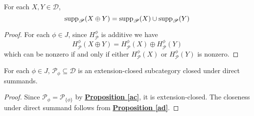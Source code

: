 \begin{prop}\label{ad}
For each $X,Y \in \mathscr{D}$, $$\textnormal{supp}_{\mathscr{P}}(X \oplus Y)= \textnormal{supp}_{\mathscr{P}}(X) \cup \textnormal{supp}_{\mathscr{P}}(Y)$$
\end{prop}

\begin{proof}
For each $\phi \in J$, since $H^{\phi}_{\mathscr{P}}$ is additive we have $$H^{\phi}_{\mathscr{P}}(X \oplus Y)= H^{\phi}_{\mathscr{P}}(X) \oplus H^{\phi}_{\mathscr{P}}(Y)$$
which can be nonzero if and only if either $H^{\phi}_{\mathscr{P}}(X)$ or $H^{\phi}_{\mathscr{P}}(Y)$ is nonzero. 
\end{proof}

\begin{prop}\label{ttc}
For each $\phi \in J$, $\mathscr{P}_{\phi} \subseteq \mathscr{D}$ is an extension-closed subcategory closed under direct summands. 
\end{prop}

\begin{proof}
Since $\mathscr{P}_{\phi}=\mathscr{P}_{\{ \phi \}}$ by \hyperref[ac]{\textbf{Proposition \ref*{ac}}}, it is extension-closed. The closeness under direct summand follows from \hyperref[ad]{\textbf{Proposition \ref*{ad}}}.  
\end{proof}

